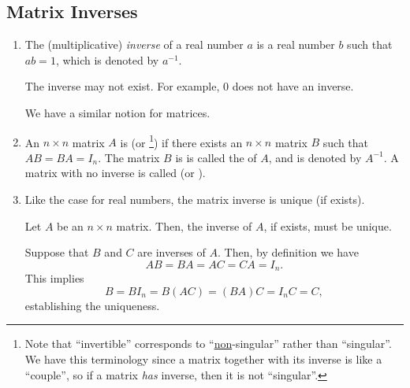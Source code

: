 \subsection{Matrix Inverses}
\label{subsect:matrix-inv}
\begin{enumerate}
\item The (multiplicative) \emph{inverse} of a real number \(a\) is a real
number \(b\) such that \(ab=1\), which is denoted by \(a^{-1}\). \begin{note}
The inverse may not exist. For example, \(0\) does not have an inverse.
\end{note}

We have a similar notion for matrices.

\item An \(n\times n\) matrix \(A\) is  (or
\footnote{Note that ``invertible'' corresponds to
``\underline{non}-singular'' rather than ``singular''. We have this terminology
since a matrix together with its inverse is like a ``couple'', so if a matrix
\emph{has} inverse, then it is not ``singular''.}) if there exists an \(n\times
n\) matrix \(B\) such that \(AB=BA=I_n\).  The matrix \(B\) is is called the
 of \(A\), and is denoted by \(A^{-1}\). A matrix with no inverse
is called  (or ).


\item Like the case for real numbers, the matrix inverse is unique (if exists).
\begin{proposition}
\label{prp:matrix-inv-unique}
Let \(A\) be an \(n\times n\) matrix. Then, the inverse of \(A\), if exists,
must be unique.
\end{proposition}
\begin{pf}
Suppose that \(B\) and \(C\) are inverses of \(A\). Then, by definition we have
\[
AB=BA=AC=CA=I_n.
\]
This implies
\[
B=BI_n=B(AC)=(BA)C=I_nC=C,
\]
establishing the uniqueness.
\end{pf}


\end{enumerate}
